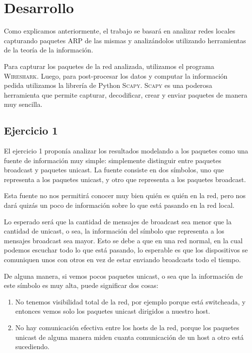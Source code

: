\section{Desarrollo}

\PARstart Como explicamos anteriormente, el trabajo se basará en analizar redes locales capturando paquetes ARP de las mismas y analizándolos utilizando herramientas de la teoría de la información.

Para capturar los paquetes de la red analizada, utilizamos el programa \textsc{Wireshark}. Luego, para post-procesar los datos y computar la información pedida utilizamos la librería de Python \textsc{Scapy}. \textsc{Scapy} es una poderosa herramienta que permite capturar, decodificar, crear y enviar paquetes de manera muy sencilla.

\subsection{Ejercicio 1}

El ejercicio 1 proponía analizar los resultados modelando a los paquetes como una fuente de información muy simple: simplemente distinguir entre paquetes broadcast y paquetes unicast. La fuente consiste en dos símbolos, uno que representa a los paquetes unicast, y otro que representa a los paquetes broadcast.

Esta fuente no nos permitirá conocer muy bien quién es quién en la red, pero nos dará quizás un poco de información sobre lo que está pasando en la red local.

Lo esperado será que la cantidad de mensajes de broadcast sea menor que la cantidad de unicast, o sea, la información del símbolo que representa a los mensajes broadcast sea mayor. Esto se debe a que en una red normal, en la cual podemos escuchar todo lo que está pasando, lo esperable es que los dispositivos se comuniquen unos con otros en vez de estar enviando broadcasts todo el tiempo.

De alguna manera, si vemos pocos paquetes unicast, o sea que la información de este símbolo es muy alta, puede significar dos cosas:

\begin{enumerate}
  \item No tenemos visibilidad total de la red, por ejemplo porque está switcheada, y entonces vemos solo los paquetes unicast dirigidos a nuestro host.
  \item No hay comunicación efectiva entre los hosts de la red, porque los paquetes unicast de alguna manera miden cuanta comunicación de un host a otro está sucediendo.
\end{enumerate}

